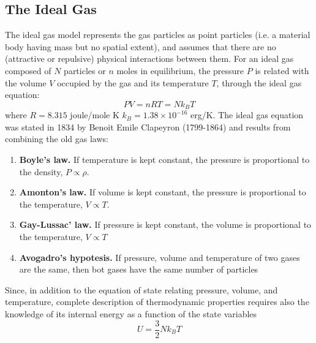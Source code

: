 \documentclass[../../../Main.tex]{subfiles}
\begin{document}
\subsection*{The Ideal Gas} 
The ideal gas model represents the gas particles as point particles (i.e. a material body having mass but no spatial extent), and assumes that there are no (attractive or repulsive) physical interactions between them. For an ideal gas composed of $N$ particles or $n$ moles in equilibrium, the pressure $P$ is related with the volume $V$ occupied by the gas and its temperature $T$, through the ideal gas equation:
\begin{equation*}
    P V = n RT = N k_B T
\end{equation*}
where $R=8.315$ joule/mole K $k_B = 1.38 \times 10^{-16}$ erg/K. The ideal gas equation was stated in 1834 by Benoit Emile Clapeyron (1799-1864) and results from combining the old gas laws: 
\begin{enumerate}
    \item \textbf{Boyle's law.} If temperature is kept constant, the pressure is proportional to the density, $P\propto \rho$. 
    \item \textbf{Amonton's law.} If volume is kept constant, the pressure is proportional to the temperature, $V\propto T$.
    \item \textbf{Gay-Lussac' law.} If pressure is kept constant, the volume is proportional to the temperature, $V\propto T$
    \item \textbf{Avogadro's hypotesis.} If pressure, volume and temperature of two gases are the same, then bot gases have the same number of particles  
\end{enumerate}
Since, in addition to the equation of state relating pressure, volume, and temperature, complete description of thermodynamic properties requires also the knowledge of its internal energy as a function of the state variables
\begin{equation*}
    U=\frac{3}{2}Nk_B T
\end{equation*}
\end{document}
